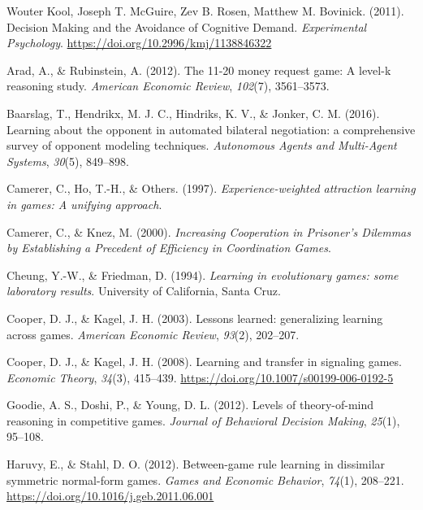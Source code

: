 \documentclass[man,floatsintext]{apa6}
\begin{document}
\leavevmode\hypertarget{ref-Kool_2011}{}%
Wouter Kool, Joseph T. McGuire, Zev B. Rosen, Matthew M. Bovinick. (2011). Decision Making and the Avoidance of Cognitive Demand. \emph{Experimental Psychology}. \url{https://doi.org/10.2996/kmj/1138846322}

\leavevmode\hypertarget{ref-arad201211}{}%
Arad, A., \& Rubinstein, A. (2012). The 11-20 money request game: A level-k reasoning study. \emph{American Economic Review}, \emph{102}(7), 3561--3573.

\leavevmode\hypertarget{ref-baarslag2016learning}{}%
Baarslag, T., Hendrikx, M. J. C., Hindriks, K. V., \& Jonker, C. M. (2016). Learning about the opponent in automated bilateral negotiation: a comprehensive survey of opponent modeling techniques. \emph{Autonomous Agents and Multi-Agent Systems}, \emph{30}(5), 849--898.

\leavevmode\hypertarget{ref-camerer1997experience}{}%
Camerer, C., Ho, T.-H., \& Others. (1997). \emph{Experience-weighted attraction learning in games: A unifying approach}.

\leavevmode\hypertarget{ref-knez2000}{}%
Camerer, C., \& Knez, M. (2000). \emph{Increasing Cooperation in Prisoner's Dilemmas by Establishing a Precedent of Efficiency in Coordination Games}.

\leavevmode\hypertarget{ref-cheung1994learning}{}%
Cheung, Y.-W., \& Friedman, D. (1994). \emph{Learning in evolutionary games: some laboratory results}. University of California, Santa Cruz.

\leavevmode\hypertarget{ref-cooper2003lessons}{}%
Cooper, D. J., \& Kagel, J. H. (2003). Lessons learned: generalizing learning across games. \emph{American Economic Review}, \emph{93}(2), 202--207.

\leavevmode\hypertarget{ref-Cooper2008}{}%
Cooper, D. J., \& Kagel, J. H. (2008). Learning and transfer in signaling games. \emph{Economic Theory}, \emph{34}(3), 415--439. \url{https://doi.org/10.1007/s00199-006-0192-5}

\leavevmode\hypertarget{ref-goodie2012levels}{}%
Goodie, A. S., Doshi, P., \& Young, D. L. (2012). Levels of theory-of-mind reasoning in competitive games. \emph{Journal of Behavioral Decision Making}, \emph{25}(1), 95--108.

\leavevmode\hypertarget{ref-Haruvy2012}{}%
Haruvy, E., \& Stahl, D. O. (2012). Between-game rule learning in dissimilar symmetric normal-form games. \emph{Games and Economic Behavior}, \emph{74}(1), 208--221. \url{https://doi.org/10.1016/j.geb.2011.06.001}
\end{document}
